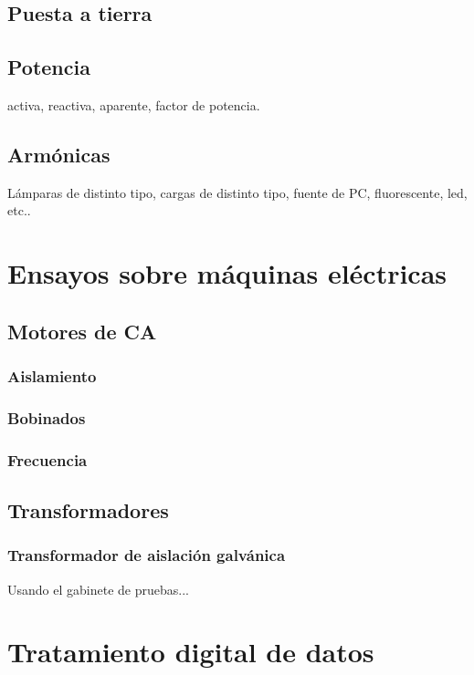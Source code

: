 \subsection{Puesta a tierra}
\subsection{Potencia}
activa, reactiva, aparente, factor de potencia.
\subsection{Armónicas}
Lámparas de distinto tipo, cargas de distinto tipo, fuente de PC, fluorescente, led, etc..

\section{Ensayos sobre máquinas eléctricas}
\subsection{Motores de CA}
\subsubsection{Aislamiento}
\subsubsection{Bobinados}
\subsubsection{Frecuencia}
\subsection{Transformadores}
	\subsubsection{Transformador de aislación galvánica}
	Usando el gabinete de pruebas...
\section{Tratamiento digital de datos}